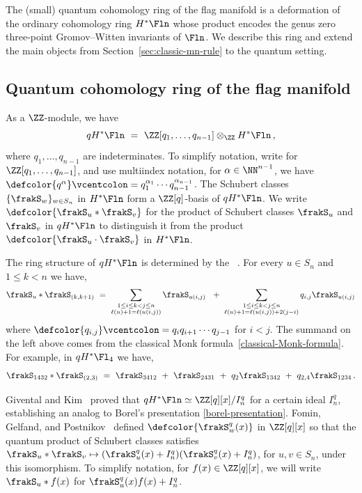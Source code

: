 The (small) quantum cohomology ring  of the flag manifold
is a deformation of the ordinary cohomology ring $H^*\Fln$ whose product encodes the genus zero three-point
Gromov--Witten invariants of $\Fln$.
We describe this ring and extend the main
objects from Section~\ref{sec:classic-mn-rule} to the quantum setting.

\subsection{Quantum cohomology ring of the flag manifold}
As a $\ZZ$-module, we have
 \begin{equation*}
    qH^*\Fln\ =\  \ZZ[q_1,\dotsc,q_{n-1}] \otimes_\ZZ H^*\Fln\,,
 \end{equation*}
where $q_1,\dotsc,q_{n-1}$ are indeterminates.
To simplify notation, write  for\break $\ZZ[q_1,\dotsc,q_{n-1}]$, and use multiindex notation, for
$\alpha\in\NN^{n-1}$, we have $\defcolor{q^\alpha}\vcentcolon= q_1^{\alpha_1}\dotsb q_{n-1}^{\alpha_{n-1}}$.
The Schubert classes $\{\frakS_w\}_{w \in S_n}$ in $H^*\Fln$
form a $\ZZ[q]$-basis of $qH^*\Fln$.
We write $\defcolor{\frakS_u \ast \frakS_v}$ for the product of Schubert
classes $\frakS_u$ and $\frakS_v$ in $qH^*\Fln$ to distinguish it from
the product $\defcolor{\frakS_u \cdot \frakS_v}$  in $H^*\Fln$.

The ring structure of $qH^*\Fln$ is determined by the ~\cite{FGP}.
For every $u\in S_n$ and $1\leq k<n$ we have,
\begin{equation}
    \label{quantum-Monk-formula}
    \frakS_u * \frakS_{(k,k+1)}
    \ =\ 
    \sum_{\substack{1 \leq i \leq k < j \leq n \\ \ell(u) + 1 = \ell(u(i,j))}} \frakS_{u (i,j)}\ 
    \ +\ 
    \sum_{\substack{1 \leq i \leq k < j \leq n \\ \ell(u) + 1 = \ell(u(i,j)) + 2(j - i)}} q_{i,j} \frakS_{u (i,j)}
\end{equation}
where $\defcolor{q_{i,j}}\vcentcolon=q_iq_{i+1}\dotsb q_{j-1}$ for $i < j$.
The summand on the left above comes from the classical Monk
formula~\eqref{classical-Monk-formula}.
For example, in $qH^*\Fl_4$ we have,
 \begin{equation}
   \label{Eq:q-Monk}
    \frakS_{1432} * \frakS_{(2,3)}
    \ =\  \frakS_{3412} \ +\ \frakS_{2431}
    \ +\ q_{2}\frakS_{1342} \ +\  q_{2,4} \frakS_{1234}\,.
 \end{equation}

Givental and Kim~\cite{GiventalKim}
proved that $qH^*\Fln \simeq \ZZ[q][x] / I^q_n$ for a certain ideal $I^q_n$,
establishing an analog to Borel's presentation \eqref{borel-presentation}.
Fomin, Gelfand, and Postnikov~\cite{FGP} defined 
$\defcolor{\frakS^q_w(x)}$ in $\ZZ[q][x]$ so that the quantum product of
Schubert classes satisfies $\frakS_u \ast \frakS_v \mapsto (\frakS^q_u(x) + I^q_n) (\frakS^q_v(x) + I^q_n)$, for $u,v\in S_n$,
under this isomorphism.
To simplify notation, for $f(x) \in \ZZ[q][x]$, we will write
$\frakS_u \ast f(x) $ for $\frakS^q_u(x) f(x) + I^q_n$.

